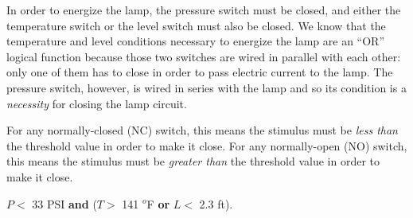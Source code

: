 In order to energize the lamp, the pressure switch must be closed, and either the temperature switch or the level switch must also be closed.  We know that the temperature and level conditions necessary to energize the lamp are an ``OR'' logical function because those two switches are wired in parallel with each other: only one of them has to close in order to pass electric current to the lamp.  The pressure switch, however, is wired in series with the lamp and so its condition is a {\it necessity} for closing the lamp circuit.

\vskip 10pt

For any normally-closed (NC) switch, this means the stimulus must be {\it less than} the threshold value in order to make it close.  For any normally-open (NO) switch, this means the stimulus must be {\it greater than} the threshold value in order to make it close. 

\vskip 10pt

$P <$ 33 PSI {\bf and} ($T >$ 141 $^{o}$F {\bf or} $L <$ 2.3 ft).




